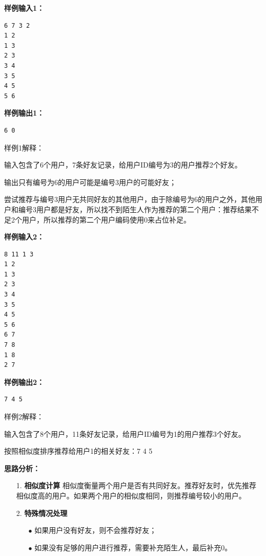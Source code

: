 \documentclass[a4paper]{ctexart}
\begin{document}
\noindent\textbf{样例输入1：}
	
\lstset{numbers=none}
\begin{lstlisting}
6 7 3 2
1 2
1 3
2 3
3 4
3 5
4 5
5 6
\end{lstlisting}
\lstset{numbers=left}
	
\noindent\textbf{样例输出1：}
\lstset{numbers=none}
\begin{lstlisting}
6 0
\end{lstlisting}
\lstset{numbers=left}

\noindent 样例1解释：

输入包含了6个用户，7条好友记录，给用户ID编号为3的用户推荐2个好友。

输出只有编号为6的用户可能是编号3用户的可能好友；

尝试推荐与编号3用户无共同好友的其他用户，由于除编号为6的用户之外，其他用户和编号3用户都是好友，所以找不到陌生人作为推荐的第二个用户：推荐结果不足2个用户，所以推荐的第二个用户编码使用0来占位补足。

\noindent\textbf{样例输入2：}

\lstset{numbers=none}
\begin{lstlisting}
8 11 1 3
1 2
1 3
2 3
3 4
3 5
4 5
5 6
6 7
7 8
1 8
2 7
\end{lstlisting}
\lstset{numbers=left}

\noindent\textbf{样例输出2：}
\lstset{numbers=none}
\begin{lstlisting}
7 4 5
\end{lstlisting}
\lstset{numbers=left}
	
\noindent 样例2解释：

输入包含了8个用户，11条好友记录，给用户ID编号为1的用户推荐3个好友。

按照相似度排序推荐给用户1的相关好友：7 4 5
	
\vspace{10pt}
	
\noindent\textbf{思路分析：}

\begin{itemize}
	\item [1.] \textbf{相似度计算} 
		相似度衡量两个用户是否有共同好友。推荐好友时，优先推荐相似度高的用户。如果两个用户的相似度相同，则推荐编号较小的用户。
		
	\item [2.] \textbf{特殊情况处理}
		\begin{itemize}
			\item[$\bullet$] 如果用户没有好友，则不会推荐好友；
			\item[$\bullet$] 如果没有足够的用户进行推荐，需要补充陌生人，最后补充0。
		\end{itemize}
\end{itemize}
\end{document}
